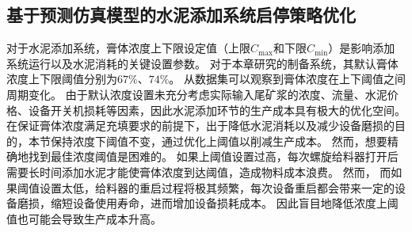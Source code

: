 
\subsection{基于预测仿真模型的水泥添加系统启停策略优化}
\label{sub:case-study2}
对于水泥添加系统，膏体浓度上下限设定值（上限$C_{\max}$和下限$C_{\min}$）是影响添加系统运行以及水泥消耗的关键设置参数。
对于本章研究的制备系统，其默认膏体浓度上下限阈值分别为$67\%$、$74\%$。
从数据集可以观察到膏体浓度在上下阈值之间周期变化。
由于默认浓度设置未充分考虑实际输入尾矿浆的浓度、流量、水泥价格、设备开关机损耗等因素，因此水泥添加环节的生产成本具有极大的优化空间。
在保证膏体浓度满足充填要求的前提下，出于降低水泥消耗以及减少设备磨损的目的，本节保持浓度下阈值不变，通过优化上阈值以削减生产成本。
然而，想要精确地找到最佳浓度阈值是困难的。
如果上阈值设置过高，每次螺旋给料器打开后需要长时间添加水泥才能使膏体浓度到达阈值，造成物料成本浪费。
然而，
而如果阈值设置太低，给料器的重启过程将极其频繁，每次设备重启都会带来一定的设备磨损，缩短设备使用寿命，进而增加设备损耗成本。
因此盲目地降低浓度上阈值也可能会导致生产成本升高。

